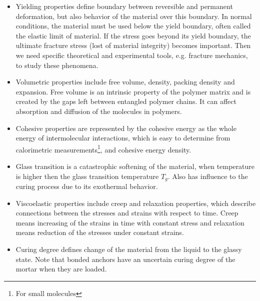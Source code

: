 \begin{itemize}
	\item 	Yielding properties define boundary between reversible and permanent deformation, but also behavior of the material over this boundary. In normal conditions, the material must be used below the yield boundary, often called the elastic limit of material. If the stress goes beyond its yield boundary, the ultimate fracture stress (lost of material integrity) becomes important. Then we need specific theoretical and experimental tools, e.g. fracture mechanics, to study these phenomena.
	
	\item Volumetric properties include free volume, density, packing density and expansion. Free volume is an intrinsic property of the polymer matrix and is created by the gaps left between entangled polymer chains. It can affect absorption and diffusion of the molecules in polymers.
	
	\item Cohesive properties are represented by the cohesive energy as the whole energy of intermolecular interactions, which is easy to determine from calorimetric measurements\footnote{For small molecules}, and cohesive energy density.
	
	\item Glass transition is a catastrophic softening of the material, when temperature is higher then the glass transition temperature $T_g$. Also has influence to the curing process due to its exothermal behavior. 
	
	\item Viscoelastic properties include creep and relaxation properties, which describe connections between the stresses and strains with respect to time. Creep means increasing of the strains in time with constant stress and relaxation means reduction of the stresses under constant strains. 
	
	\item Curing degree defines change of the material from the liquid to the glassy state. Note that bonded anchors have an uncertain curing degree of the mortar when they are loaded.
	
\end{itemize}

